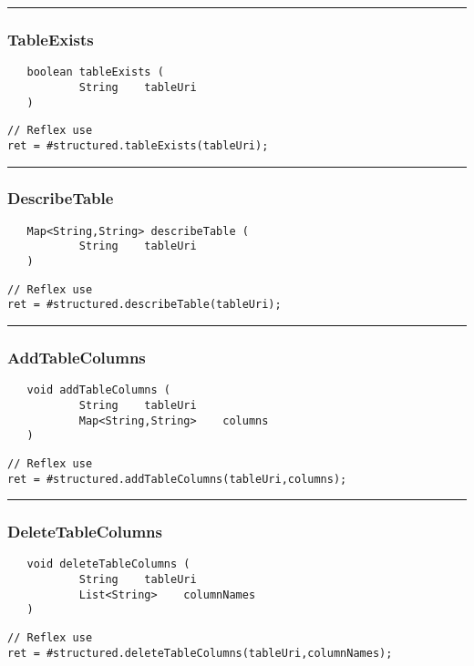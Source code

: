 \rule{15cm}{2pt}
\subsubsection{TableExists}
\label{Api:TableExists}
\begin{verbatim}
   boolean tableExists (
           String    tableUri
   )
\end{verbatim}
\begin{lstlisting}[language=reflex]
// Reflex use
ret = #structured.tableExists(tableUri);
\end{lstlisting}



\rule{15cm}{2pt}
\subsubsection{DescribeTable}
\label{Api:DescribeTable}
\begin{verbatim}
   Map<String,String> describeTable (
           String    tableUri
   )
\end{verbatim}
\begin{lstlisting}[language=reflex]
// Reflex use
ret = #structured.describeTable(tableUri);
\end{lstlisting}



\rule{15cm}{2pt}
\subsubsection{AddTableColumns}
\label{Api:AddTableColumns}
\begin{verbatim}
   void addTableColumns (
           String    tableUri
           Map<String,String>    columns
   )
\end{verbatim}
\begin{lstlisting}[language=reflex]
// Reflex use
ret = #structured.addTableColumns(tableUri,columns);
\end{lstlisting}



\rule{15cm}{2pt}
\subsubsection{DeleteTableColumns}
\label{Api:DeleteTableColumns}
\begin{verbatim}
   void deleteTableColumns (
           String    tableUri
           List<String>    columnNames
   )
\end{verbatim}
\begin{lstlisting}[language=reflex]
// Reflex use
ret = #structured.deleteTableColumns(tableUri,columnNames);
\end{lstlisting}



